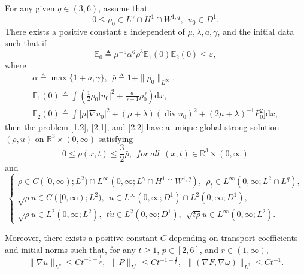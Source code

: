 \documentclass[10pt,a4paper]{amsart}
\DeclareMathOperator{\divv}{div}
\begin{document}
\begin{Theorem}\label{thm2.1}
For any given $q\in(3, 6)$, assume that
\begin{equation}\label{2.3}
0 \leq\rho_0 \in L^{\gamma} \cap H^1 \cap W^{1,q},\ \
u_0 \in D^1.
\end{equation}
There exists a positive constant $\varepsilon$ independent of $\mu, \lambda, a, \gamma$, and the initial data such that if
\begin{equation}\label{2.4}
\mathbb{E}_0\triangleq \mu^{-5} \alpha^{6} \bar{\rho}^3 \mathbb{E}_1 (0) \mathbb{E}_2 (0) \leq \varepsilon,
\end{equation}
where
\begin{gather*}
\alpha \triangleq \max\{1 + a, \gamma\},\ \ \bar{\rho} \triangleq 1 + \|\rho_0\|_{L^{\infty }},\\
\mathbb{E}_1 (0) \triangleq \int \left(\frac{1}{2} \rho_0 |u_0|^2 + \frac{a}{\gamma - 1} \rho_0^{\gamma} \right) \mathrm{d} x,\\
\mathbb{E}_2 (0)
\triangleq \int \big[\mu |\nabla u_0|^2 + (\mu + \lambda)(\divv u_0)^2 + \left(2 \mu + \lambda \right)^{-1}P_0^2 \big] \mathrm{d} x,
\end{gather*}
then the problem \eqref{1.2}, \eqref{2.1}, and \eqref{2.2} have a unique global strong solution $(\rho, u)$ on $\mathbb{R}^3 \times (0,\infty)$ satisfying
\begin{equation}\label{2.5}
0\leq \rho(x,t)\leq \frac{3}{2}\bar\rho,\ \ {for \ all}\ \  (x,t)\in \mathbb{R}^3 \times(0, \infty)
\end{equation}
and
\begin{equation}\label{2.6}
\begin{cases}
\rho \in C([0, \infty);L^2) \cap L^\infty(0, \infty; L^{\gamma} \cap H^1 \cap W^{1,q}), \ \ \rho_t \in L^\infty(0, \infty;L^2\cap L^q),\\[1mm]
\sqrt \rho u \in C ([0, \infty);L^2),\ \ u \in L^\infty(0, \infty; D^1) \cap L^2 (0, \infty; D^1),\\[1mm]
\sqrt \rho \dot{u} \in L^2 (0, \infty; L^2), \ \ t \dot{u} \in L^2 (0, \infty; D^1),\ \ \sqrt{t \rho} \dot{u} \in L^\infty(0, \infty;L^2).
\end{cases}
\end{equation}

Moreover, there exists a positive constant $C$ depending on transport coefficients and initial norms such that, for any $t \geq 1$, $p \in [2,6]$, and $r \in (1,\infty )$,
\begin{equation}\label{2.7}
\|\nabla u\|_{L^p} \leq C t^{- 1 + \frac{1}{p}},\ \
\|P\|_{L^r} \leq C t^{- 1 + \frac{1}{r}},\ \
\|(\nabla F,\nabla \omega )\|_{L^2} \leq C t^{- 1}.
\end{equation}
\end{Theorem}
\end{document}
